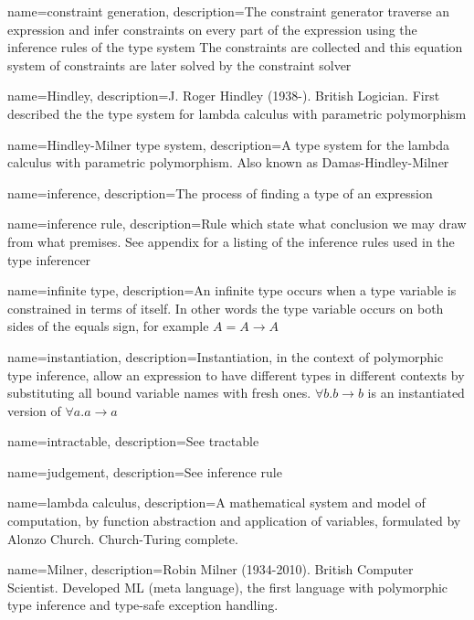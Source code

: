 { name={constraint generation},
  description={The constraint generator traverse an expression and infer constraints on every part of the expression using the inference rules of the type system The constraints are collected and this equation system of constraints are later solved by the constraint solver}
}

{ name={Hindley},
  description={J. Roger Hindley (1938-). British Logician. First described the the type system for lambda calculus with parametric polymorphism}
} %

{ name={Hindley-Milner type system},
  description={A type system for the lambda calculus with parametric polymorphism. Also known as Damas-Hindley-Milner}
}

{ name={inference},
  description={The process of finding a type of an expression}
}

{ name={inference rule},
  description={Rule which state what conclusion we may draw from what premises. See appendix for a listing of the inference rules used in the type inferencer}
}

{ name={infinite type},
  description={An infinite type occurs when a type variable is constrained in terms of itself. In other words the type variable occurs on both sides of the equals sign, for example $A = A \to A$}
}

{ name={instantiation},
  description={Instantiation, in the context of polymorphic type inference, allow an expression to have different types in different contexts by substituting all bound variable names with fresh ones. $\forall b . b \to b$ is an instantiated version of $\forall a . a \to a$}
}

{ name={intractable},
  description={See tractable}
}

{ name={judgement},
  description={See inference rule}
}

{ name={lambda calculus},
  description={A mathematical system and model of computation, by function abstraction and application of variables, formulated by Alonzo Church. Church-Turing complete.}
} %

{ name={Milner},
  description={Robin Milner (1934-2010). British Computer Scientist. Developed ML (meta language), the first language with polymorphic type inference and type-safe exception handling.}
} %

